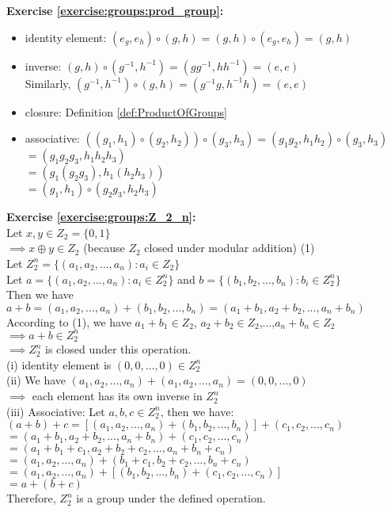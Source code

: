 \noindent\textbf{Exercise \ref{exercise:groups:prod_group}:}
\begin{itemize}
\item
identity element: $(e_g, e_h) \circ (g, h) = (g, h) \circ (e_g, e_h) = (g, h)$

\item
inverse: $(g, h) \circ (g^{-1}, h^{-1}) = (g g^{-1}, h h^{-1}) = (e, e)$\\
Similarly, $(g^{-1}, h^{-1}) \circ (g, h)  = ( g^{-1} g,  h^{-1}h) = (e, e)$

\item
closure: Definition \ref{def:ProductOfGroups}

\item
associative: $((g_1, h_1) \circ (g_2, h_2)) \circ (g_3, h_3) = (g_1 g_2, h_1 h_2) \circ (g_3, h_3)$\\
$= (g_1 g_2 g_3, h_1 h_2 h_3)$\\
$= (g_1 (g_2 g_3), h_1 (h_2 h_3))$\\
$= (g_1, h_1) \circ (g_2 g_3, h_2 h_3)$
\end{itemize}

\textbf{Exercise \ref{exercise:groups:Z_2_n}:}\\
Let $x,y\in Z_2=\{0,1\}$\\
$\implies x\oplus y\in Z_2$ (because $Z_2$ closed under modular addition) (1)\\
Let $Z_2^n=\{(a_1,a_2,...,a_n):a_i\in Z_2\}$\\
Let $a=\{(a_1,a_2,...,a_n):a_i\in Z_2^n\}$ and $b=\{(b_1,b_2,...,b_n):b_i\in Z_2^n\}$\\
Then we have $a+b=(a_1,a_2,...,a_n)+(b_1,b_2,...,b_n)=(a_1+b_1,a_2+b_2,...,a_n+b_n)$\\
According to (1), we have $a_1+b_1\in Z_2$, $a_2+b_2\in Z_2$,...,$a_n+b_n\in Z_2$\\
$\implies a+b\in Z_2^n$\\
$\implies Z_2^n$ is closed under this operation.\\
(i) identity element is $(0,0,...,0)\in Z_2^n$\\
(ii) We have $(a_1,a_2,...,a_n)+(a_1,a_2,...,a_n)=(0,0,...,0)$\\
$\implies$  each element has its own inverse in $Z_2^n$\\
(iii) Associative: Let $a,b,c\in Z_2^n$, then we have:\\
$(a+b)+c =[(a_1,a_2,...,a_n)+(b_1,b_2,...,b_n)]+(c_1,c_2,...,c_n)$\\
$=(a_1+b_1,a_2+b_2,...,a_n+b_n)+(c_1,c_2,...,c_n)$\\
$=(a_1+b_1+c_1,a_2+b_2+c_2,...,a_n+b_n+c_n)$\\
$=(a_1,a_2,...,a_n)+(b_1+c_1,b_2+c_2,...,b_n+c_n)$\\
$=(a_1,a_2,...,a_n)+[(b_1,b_2,...,b_n)+(c_1,c_2,...,c_n)]$\\
$=a+(b+c)$\\
Therefore, $Z_2^n$ is a group under the defined operation.\\
\\


